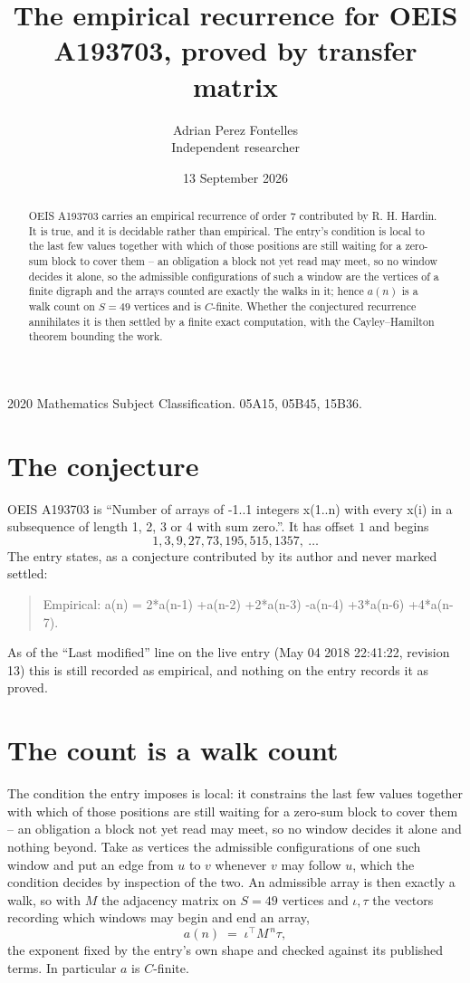 \documentclass[11pt,a4paper]{article}
\title{The empirical recurrence for OEIS A193703, proved by transfer matrix}
\author{Adrian Perez Fontelles\\ \small Independent researcher}
\date{13 September 2026}
\theoremstyle{plain}
\theoremstyle{definition}
\begin{document}
\maketitle

\begin{abstract}
OEIS A193703 carries an empirical recurrence of order $7$ contributed by R. H. Hardin. It is
true, and it is decidable rather than empirical. The entry's condition is local to the last few values together with which of those positions are still waiting for a zero-sum block to cover them -- an obligation a block not yet read may meet, so no window decides it alone, so
the admissible configurations of such a window are the vertices of a finite digraph and the
arrays counted are exactly the walks in it; hence $a(n)$ is a walk count on $S=49$ vertices
and is $C$-finite. Whether the conjectured recurrence annihilates it is then settled by a
finite exact computation, with the Cayley--Hamilton theorem bounding the work.
\end{abstract}

\noindent\small 2020 Mathematics Subject Classification. 05A15, 05B45, 15B36.\normalsize

\section{The conjecture}

OEIS A193703 is ``Number of arrays of -1..1 integers x(1..n) with every x(i) in a subsequence of length 1, 2, 3 or 4 with sum zero.''. It has offset $1$ and begins
\[
1, 3, 9, 27, 73, 195, 515, 1357,\ \dots
\]
The entry states, as a conjecture contributed by its author and never marked settled:
\begin{quote}
Empirical: a(n) = 2*a(n-1) +a(n-2) +2*a(n-3) -a(n-4) +3*a(n-6) +4*a(n-7).
\end{quote}
As of the ``Last modified'' line on the live entry (May 04 2018 22:41:22, revision 13) this is still
recorded as empirical, and nothing on the entry records it as proved.

\section{The count is a walk count}

The condition the entry imposes is local: it constrains the last few values together with which of those positions are still waiting for a zero-sum block to cover them -- an obligation a block not yet read may meet, so no window decides it alone and nothing beyond. Take as
vertices the admissible configurations of one such window and put an edge from $u$ to $v$
whenever $v$ may follow $u$, which the condition decides by inspection of the two. An
admissible array is then exactly a walk, so with $M$ the adjacency matrix on $S=49$ vertices
and $\iota,\tau$ the vectors recording which windows may begin and end an array,
\[
a(n)\;=\;\iota^{\!\top}M^{\,n}\tau ,
\]
the exponent fixed by the entry's own shape and checked against its published terms. In
particular $a$ is $C$-finite.
\end{document}
